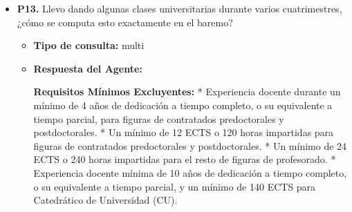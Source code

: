 \documentclass{article}
\begin{document}
\begin{itemize}
\begin{itemize}
                        Recuerda que, si te opones a la consulta telemática, debes acreditar documentalmente tu condición de discapacidad y seguir el procedimiento establecido para ello. Puedes consultar más información en los enlaces proporcionados por la Universidad de Sevilla, como [https://osi.us.es](https://osi.us.es) y [https://osi.us.es/sites/osi/files/doc/c.i.gestionestudiantesoficialesModif1.12.5.20CT.pdf](https://osi.us.es/sites/osi/files/doc/c.i.gestionestudiantesoficialesModif1.12.5.20CT.pdf).
                  \item \textbf{Contexto utilizado:}

            \end{itemize}

      \item \textbf{P13.} Llevo dando algunas clases universitarias durante varios cuatrimestres, ¿cómo se computa esto exactamente en el baremo? \\
            \begin{itemize}
                  \item \textbf{Tipo de consulta:} multi
                  \item \textbf{Respuesta del Agente:}

                        \textbf{Requisitos Mínimos Excluyentes:}
                        * Experiencia docente durante un mínimo de 4 años de dedicación a tiempo completo, o su equivalente a tiempo parcial, para figuras de contratados predoctorales y postdoctorales.
                        * Un mínimo de 12 ECTS o 120 horas impartidas para figuras de contratados predoctorales y postdoctorales.
                        * Un mínimo de 24 ECTS o 240 horas impartidas para el resto de figuras de profesorado.
                        * Experiencia docente mínima de 10 años de dedicación a tiempo completo, o su equivalente a tiempo parcial, y un mínimo de 140 ECTS para Catedrático de Universidad (CU).


\end{itemize}
\end{itemize}
\end{document}
